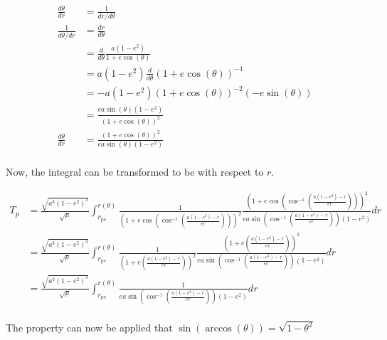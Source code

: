 \documentclass[../main.tex]{subfiles}
\begin{document}
\begin{align*}
    \frac{d\theta}{dr}   & = \frac{1}{dr/d\theta}                             \\
    \frac{1}{d\theta/dr} & = \frac{dr}{d\theta}                               \\
                         & =\frac{d}{d\theta}\frac{a(1-e^2)}{1+e\cos(\theta)} \\
                         & =a(1-e^2)\frac{d}{d\theta}(1+e\cos(\theta))^{-1}   \\
                         & =-a(1-e^2)(1+e\cos(\theta))^{-2}(-e\sin(\theta))   \\
                         & =\frac{ea\sin(\theta)(1-e^2)}{(1+e\cos(\theta))^2} \\
    \frac{d\theta}{dr}   & =\frac{(1+e\cos(\theta))^2}{ea\sin(\theta)(1-e^2)} \\
\end{align*}

Now, the integral can be transformed to be with respect to $r$.

\begin{align*}
    T_p & = \frac{\sqrt{a^3(1-e^2)^3}}{\sqrt{\mu}}\int_{r_\text{pe}}^{r(\theta)}\frac{1}{\left(1+e\cos\left(\cos^{-1}\left(\frac{a(1-e^2)-r}{er}\right)\right)\right)^2}\frac{\left(1+e\cos\left(\cos^{-1}\left(\frac{a(1-e^2)-r}{er}\right)\right)\right)^2}{ea\sin\left(\cos^{-1}\left(\frac{a(1-e^2)-r}{er}\right)\right)(1-e^2)}dr \\
        & =\frac{\sqrt{a^3(1-e^2)^3}}{\sqrt{\mu}}\int_{r_\text{pe}}^{r(\theta)}\frac{1}{\left(1+e\left(\frac{a(1-e^2)-r}{er}\right)\right)^2}\frac{\left(1+e\left(\frac{a(1-e^2)-r}{er}\right)\right)^2}{ea\sin\left(\cos^{-1}\left(\frac{a(1-e^2)-r}{er}\right)\right)(1-e^2)}dr                                                      \\
        & =\frac{\sqrt{a^3(1-e^2)^3}}{\sqrt{\mu}}\int_{r_\text{pe}}^{r(\theta)}\frac{1}{ea\sin\left(\cos^{-1}\left(\frac{a(1-e^2)-r}{er}\right)\right)(1-e^2)}dr                                                                                                                                                                       \\
\end{align*}

The property can now be applied that $\sin(\arccos(\theta))=\sqrt{1-\theta^2}$
\end{document}
